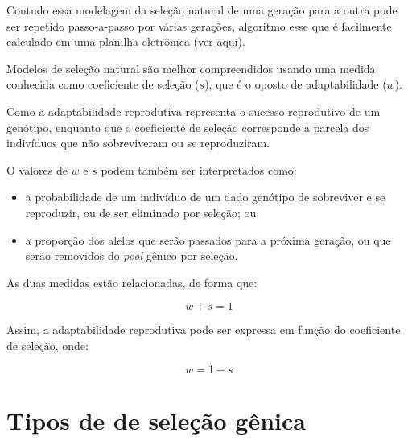 \documentclass[
]{book}
\providecommand{\tightlist}{%
  \setlength{\itemsep}{0pt}\setlength{\parskip}{0pt}}
\begin{document}
Contudo essa modelagem da seleção natural de uma geração para a outra pode ser repetido passo-a-passo por várias gerações, algoritmo esse que é facilmente calculado em uma planilha eletrônica (ver \href{link\%20para\%20a\%20planilha}{aqui}).

Modelos de seleção natural são melhor compreendidos usando uma medida conhecida como coeficiente de seleção (\(s\)), que é o oposto de adaptabilidade (\(w\)).

Como a adaptabilidade reprodutiva representa o sucesso reprodutivo de um genótipo, enquanto que o coeficiente de seleção corresponde a parcela dos indivíduos que não sobreviveram ou se reproduziram.

O valores de \(w\) e \(s\) podem também ser interpretados como:

\begin{itemize}
\tightlist
\item
  a probabilidade de um indivíduo de um dado genótipo de sobreviver e se reproduzir, ou de ser eliminado por seleção; ou
\end{itemize}

\begin{itemize}
\tightlist
\item
  a proporção dos alelos que serão passados para a próxima geração, ou que serão removidos do \emph{pool} gênico por seleção.
\end{itemize}

As duas medidas estão relacionadas, de forma que:

\[w+s=1\]

Assim, a adaptabilidade reprodutiva pode ser expressa em função do coeficiente de seleção, onde:

\[w=1-s\]

\hypertarget{tipos-de-de-seleuxe7uxe3o-guxeanica}{%
\section{Tipos de de seleção gênica}\label{tipos-de-de-seleuxe7uxe3o-guxeanica}}
\end{document}
